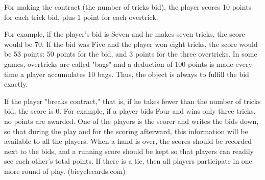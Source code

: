 For making the contract (the number of tricks bid), the player scores 10 points for each trick bid, plus 1 point for each overtrick.

For example, if the player's bid is Seven and he makes seven tricks, the score would be 70. If the bid was Five and the player won eight tricks, the score would be 53 points: 50 points for the bid, and 3 points for the three overtricks. In some games, overtricks are called "bags" and a deduction of 100 points is made every time a player accumulates 10 bags. Thus, the object is always to fulfill the bid exactly.

If the player "breaks contract," that is, if he takes fewer than the number of tricks bid, the score is 0. For example, if a player bids Four and wins only three tricks, no points are awarded.
One of the players is the scorer and writes the bids down, so that during the play and for the scoring afterward, this information will be available to all the players. When a hand is over, the scores should be recorded next to the bids, and a running score should be kept so that players can readily see each other's total points. If there is a tie, then all players participate in one more round of play. (bicyclecards.com)

